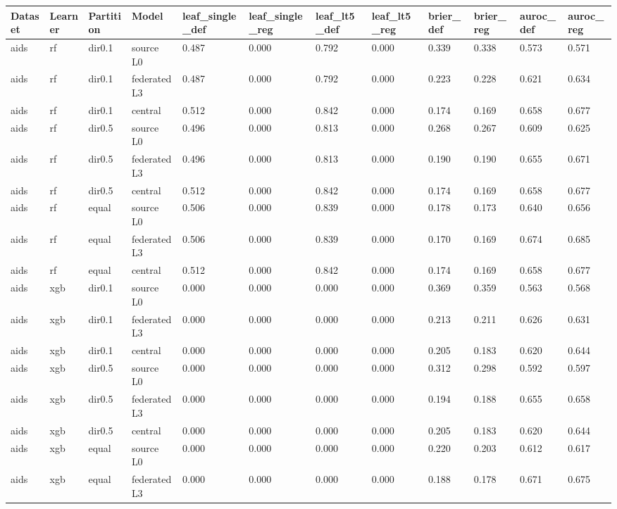 \begin{tabular}{llllllllllll}
\toprule
Dataset & Learner & Partition & Model & leaf\_single\_def & leaf\_single\_reg & leaf\_lt5\_def & leaf\_lt5\_reg & brier\_def & brier\_reg & auroc\_def & auroc\_reg \\
\midrule
aids & rf & dir0.1 & source L0 & 0.487 & 0.000 & 0.792 & 0.000 & 0.339 & 0.338 & 0.573 & 0.571 \\
aids & rf & dir0.1 & federated L3 & 0.487 & 0.000 & 0.792 & 0.000 & 0.223 & 0.228 & 0.621 & 0.634 \\
aids & rf & dir0.1 & central & 0.512 & 0.000 & 0.842 & 0.000 & 0.174 & 0.169 & 0.658 & 0.677 \\
aids & rf & dir0.5 & source L0 & 0.496 & 0.000 & 0.813 & 0.000 & 0.268 & 0.267 & 0.609 & 0.625 \\
aids & rf & dir0.5 & federated L3 & 0.496 & 0.000 & 0.813 & 0.000 & 0.190 & 0.190 & 0.655 & 0.671 \\
aids & rf & dir0.5 & central & 0.512 & 0.000 & 0.842 & 0.000 & 0.174 & 0.169 & 0.658 & 0.677 \\
aids & rf & equal & source L0 & 0.506 & 0.000 & 0.839 & 0.000 & 0.178 & 0.173 & 0.640 & 0.656 \\
aids & rf & equal & federated L3 & 0.506 & 0.000 & 0.839 & 0.000 & 0.170 & 0.169 & 0.674 & 0.685 \\
aids & rf & equal & central & 0.512 & 0.000 & 0.842 & 0.000 & 0.174 & 0.169 & 0.658 & 0.677 \\
aids & xgb & dir0.1 & source L0 & 0.000 & 0.000 & 0.000 & 0.000 & 0.369 & 0.359 & 0.563 & 0.568 \\
aids & xgb & dir0.1 & federated L3 & 0.000 & 0.000 & 0.000 & 0.000 & 0.213 & 0.211 & 0.626 & 0.631 \\
aids & xgb & dir0.1 & central & 0.000 & 0.000 & 0.000 & 0.000 & 0.205 & 0.183 & 0.620 & 0.644 \\
aids & xgb & dir0.5 & source L0 & 0.000 & 0.000 & 0.000 & 0.000 & 0.312 & 0.298 & 0.592 & 0.597 \\
aids & xgb & dir0.5 & federated L3 & 0.000 & 0.000 & 0.000 & 0.000 & 0.194 & 0.188 & 0.655 & 0.658 \\
aids & xgb & dir0.5 & central & 0.000 & 0.000 & 0.000 & 0.000 & 0.205 & 0.183 & 0.620 & 0.644 \\
aids & xgb & equal & source L0 & 0.000 & 0.000 & 0.000 & 0.000 & 0.220 & 0.203 & 0.612 & 0.617 \\
aids & xgb & equal & federated L3 & 0.000 & 0.000 & 0.000 & 0.000 & 0.188 & 0.178 & 0.671 & 0.675 \\

\end{tabular}
